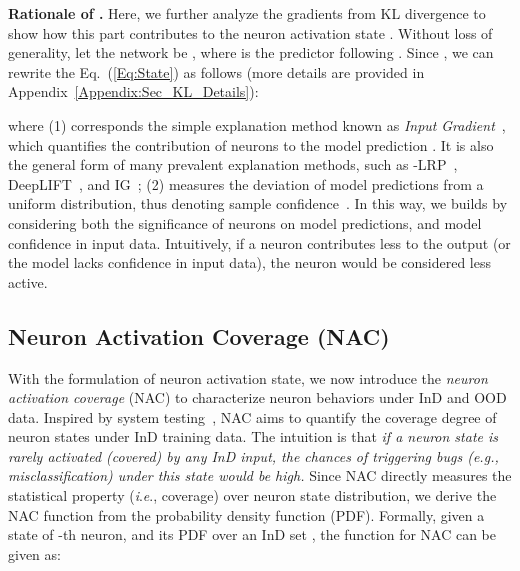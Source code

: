 \documentclass{article} \usepackage{iclr2024_conference,times}
\newcommand{\ie}{\textit{i}.\textit{e}.}
\newcommand{\eg}{\textit{e}.\textit{g}.}
\newcommand{\bfstart}[1]{\noindent\textbf{#1.}}
\begin{document}
\bfstart{Rationale of } Here, we further analyze the gradients from KL divergence to show how this part contributes to the neuron activation state . 
Without loss of generality, let the network be , where  is the predictor following . 
Since , we can rewrite the Eq.~(\ref{Eq:State}) as follows (more details are provided in Appendix~\ref{Appendix:Sec_KL_Details}):
\vspace{-1mm}

where 
(1)  corresponds the simple explanation method known as \textit{Input}  \textit{Gradient}~\citep{exp:inputXgrad}, which quantifies the contribution of neurons to the model prediction . 
It is also the general form of many prevalent explanation methods, such as -LRP~\citep{exp:LRP}, DeepLIFT~\citep{exp:DeepLIFT}, and IG~\citep{exp:IG}; 
(2)  measures the deviation of model predictions from a uniform distribution, thus denoting sample confidence~\citep{OOD_Detect:GradNorm}.
In this way, we builds  by considering both the significance of neurons on model predictions, and model confidence in input data.
Intuitively, if a neuron contributes less to the output (or the model lacks confidence in input data), the neuron would be considered less active.


























\vspace{-1mm}
\subsection{Neuron Activation Coverage (NAC)}
\vspace{-1mm}
\label{Sec:Method_NACFunc}
With the formulation of neuron activation state, we now introduce the \textit{neuron activation coverage} (NAC) to characterize neuron behaviors under InD and OOD data. 
Inspired by system testing~\citep{NACT_System:DeepXplore,NACT_System:DeepGauge,NACT_System:DeepHunter}, NAC aims to quantify the coverage degree of neuron states under InD training data. 
The intuition is that \textit{if a neuron state is rarely activated (covered) by any InD input, the chances of triggering bugs (\eg, misclassification) under this state would be high.}
Since NAC directly measures the statistical property (\ie, coverage) over neuron state distribution, we derive the NAC function from the probability density function (PDF).
Formally, given a state  of -th neuron, and its PDF  over an InD set , the function for NAC can be given as:
\vspace{-1mm}
\end{document}
